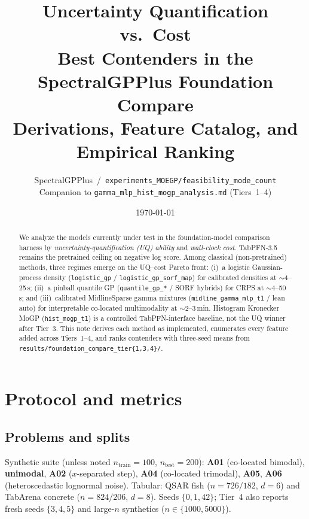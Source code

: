 \documentclass[11pt,a4paper]{article}
\title{\textbf{Uncertainty Quantification vs.\ Cost}\\[0.35em]
\large Best Contenders in the SpectralGPPlus Foundation Compare\\[0.25em]
\normalsize Derivations, Feature Catalog, and Empirical Ranking}
\author{SpectralGPPlus \,/\, \texttt{experiments\_MOEGP/feasibility\_mode\_count}\\
Companion to \texttt{gamma\_mlp\_hist\_mogp\_analysis.md} (Tiers~1--4)}
\date{\today}
\theoremstyle{definition}
\begin{document}
\maketitle

\begin{abstract}
We analyze the models currently under test in the foundation-model comparison
harness by \emph{uncertainty-quantification (UQ) ability} and \emph{wall-clock
cost}. TabPFN-3.5 remains the pretrained ceiling on negative log score.
Among classical (non-pretrained) methods, three regimes emerge on the
UQ--cost Pareto front: (i)~a logistic Gaussian-process density
(\texttt{logistic\_gp} / \texttt{logistic\_gp\_sorf\_map}) for calibrated
densities at $\sim$4--25\,s; (ii)~a pinball quantile GP
(\texttt{quantile\_gp\_*} / SORF hybrids) for CRPS at $\sim$4--50\,s; and
(iii)~calibrated MidlineSparse gamma mixtures
(\texttt{midline\_gamma\_mlp\_t1} / lean auto) for interpretable
co-located multimodality at $\sim$2--3\,min.
Histogram Kronecker MoGP (\texttt{hist\_mogp\_t1}) is a controlled
TabPFN-interface baseline, not the UQ winner after Tier~3.
This note derives each method as implemented, enumerates every feature added
across Tiers~1--4, and ranks contenders with three-seed means from
\texttt{results/foundation\_compare\_tier\{1,3,4\}/}.
\end{abstract}

\tableofcontents
\newpage

\section{Protocol and metrics}
\label{sec:protocol}

\subsection{Problems and splits}
Synthetic suite (unless noted $n_{\mathrm{train}}=100$, $n_{\mathrm{test}}=200$):
\textbf{A01} (co-located bimodal), \textbf{unimodal}, \textbf{A02} ($x$-separated
step), \textbf{A04} (co-located trimodal), \textbf{A05}, \textbf{A06}
(heteroscedastic lognormal noise).
Tabular: QSAR fish ($n{=}726/182$, $d{=}6$) and TabArena concrete
($n{=}824/206$, $d{=}8$). Seeds $\{0,1,42\}$; Tier~4 also reports fresh
seeds $\{3,4,5\}$ and large-$n$ synthetics ($n\in\{1000,5000\}$).
\end{document}

